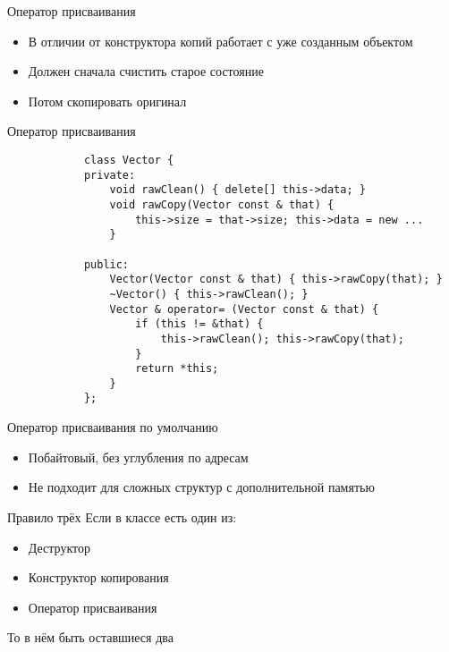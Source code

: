 \documentclass[aspectratio=169,14pt]{beamer}
\begin{document}
    \begin{frame}{Оператор присваивания}
        \begin{itemize}
            \item В отличии от конструктора копий работает с уже созданным объектом
            \item Должен сначала счистить старое состояние
            \item Потом скопировать оригинал
        \end{itemize}
    \end{frame}


    \begin{frame}[fragile]{Оператор присваивания}
        \begin{verbatim}
            class Vector {
            private:
                void rawClean() { delete[] this->data; }
                void rawCopy(Vector const & that) {
                    this->size = that->size; this->data = new ...
                }

            public:
                Vector(Vector const & that) { this->rawCopy(that); }
                ~Vector() { this->rawClean(); }
                Vector & operator= (Vector const & that) {
                    if (this != &that) {
                        this->rawClean(); this->rawCopy(that);
                    }
                    return *this;
                }
            };
        \end{verbatim}
    \end{frame}

    \begin{frame}[fragile]{Оператор присваивания по умолчанию}
        \begin{itemize}
            \item Побайтовый, без углубления по адресам
            \item Не подходит для сложных структур с дополнительной памятью
        \end{itemize}
    \end{frame}

    \begin{frame}[fragile]{Правило трёх}
        Если в классе есть один из:
        \begin{itemize}
            \item Деструктор
            \item Конструктор копирования
            \item Оператор присваивания
        \end{itemize}

        То в нём  быть оставшиеся два
    \end{frame}
\end{document}
